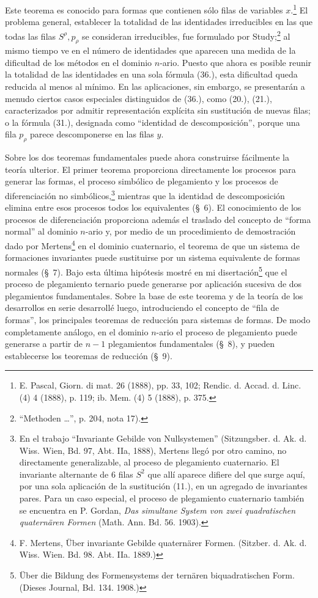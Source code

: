 \documentclass[11pt]{article}
\begin{document}
Este teorema es conocido para formas que contienen sólo filas de variables $x$.\footnote{E. Pascal, Giorn. di mat. 26 (1888), pp. 33, 102; Rendic. d. Accad. d. Linc. (4) 4 (1888), p. 119; ib. Mem. (4) 5 (1888), p. 375.} El problema general, establecer la totalidad de las identidades irreducibles en las que todas las filas $S^\rho,p_\rho$ se consideran irreducibles, fue formulado por Study;\footnote{``Methoden \dots'', p. 204, nota 17).} al mismo tiempo ve en el número de identidades que aparecen una medida de la dificultad de los métodos en el dominio $n$-ario. Puesto que ahora es posible reunir la totalidad de las identidades en una sola fórmula (36.), esta dificultad queda reducida al menos al mínimo. En las aplicaciones, sin embargo, se presentarán a menudo ciertos casos especiales distinguidos de (36.), como (20.), (21.), caracterizados por admitir representación explícita sin sustitución de nuevas filas; o la fórmula (31.), designada como ``identidad de descomposición'', porque una fila $p_\rho$ parece descomponerse en las filas $y$.

Sobre los dos teoremas fundamentales puede ahora construirse fácilmente la teoría ulterior. El primer teorema proporciona directamente los procesos para generar las formas, el proceso simbólico de plegamiento y los procesos de diferenciación no simbólicos,\footnote{En el trabajo ``Invariante Gebilde von Nullsystemen'' (Sitzungsber. d. Ak. d. Wiss. Wien, Bd. 97, Abt. IIa, 1888), Mertens llegó por otro camino, no directamente generalizable, al proceso de plegamiento cuaternario. El invariante alternante de 6 filas $S^2$ que allí aparece difiere del que surge aquí, por una sola aplicación de la sustitución (11.), en un agregado de invariantes pares. Para un caso especial, el proceso de plegamiento cuaternario también se encuentra en P. Gordan, \emph{Das simultane System von zwei quadratischen quaternären Formen} (Math. Ann. Bd. 56. 1903).} mientras que la identidad de descomposición elimina entre esos procesos todos los equivalentes (\S\ 6). El conocimiento de los procesos de diferenciación proporciona además el traslado del concepto de ``forma normal'' al dominio $n$-ario y, por medio de un procedimiento de demostración dado por Mertens\footnote{F. Mertens, Über invariante Gebilde quaternärer Formen. (Sitzber. d. Ak. d. Wiss. Wien. Bd. 98. Abt. IIa. 1889.)} en el dominio cuaternario, el teorema de que un sistema de formaciones invariantes puede sustituirse por un sistema equivalente de formas normales (\S\ 7). Bajo esta última hipótesis mostré en mi disertación\footnote{Über die Bildung des Formensystems der ternären biquadratischen Form. (Dieses Journal, Bd. 134. 1908.)} que el proceso de plegamiento ternario puede generarse por aplicación sucesiva de dos plegamientos fundamentales. Sobre la base de este teorema y de la teoría de los desarrollos en serie desarrollé luego, introduciendo el concepto de ``fila de formas'', los principales teoremas de reducción para sistemas de formas. De modo completamente análogo, en el dominio $n$-ario el proceso de plegamiento puede generarse a partir de $n-1$ plegamientos fundamentales (\S\ 8), y pueden establecerse los teoremas de reducción (\S\ 9).
\end{document}
